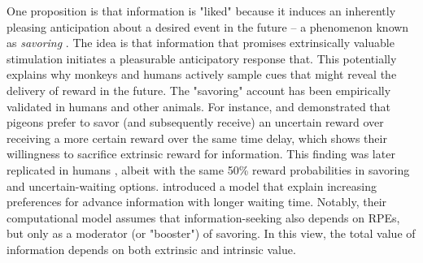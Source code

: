 One proposition is that information is "liked" because it induces an inherently pleasing anticipation about a desired event in the future -- a phenomenon known as \emph{savoring} \parencite{loewenstein_anticipation_1987}. The idea is that information that promises extrinsically valuable stimulation initiates a pleasurable anticipatory response that. This potentially explains why monkeys \parencite{bromberg-martin_midbrain_2009,bromberg-martin_lateral_2011} and humans \parencite{van_lieshout_induction_2018,kobayashi_diverse_2019} actively sample cues that might reveal the delivery of reward in the future. The "savoring" account has been empirically validated in humans and other animals. For instance, \citeauthor{spetch_suboptimal_1990} \citeyearpar{spetch_suboptimal_1990} and \citeauthor{gipson_preference_2009} \citeyearpar{gipson_preference_2009} demonstrated that pigeons prefer to savor (and subsequently receive) an uncertain reward over receiving a more certain \parencite[up to 100\% certain in][]{spetch_suboptimal_1990} reward over the same time delay, which shows their willingness to sacrifice extrinsic reward for information. This finding was later replicated in humans \parencite{iigaya_modulation_2016}, albeit with the same 50\% reward probabilities in savoring and uncertain-waiting options. \citeauthor{iigaya_modulation_2016} \citeyearpar{iigaya_modulation_2016} introduced a model that explain increasing preferences for advance information with longer waiting time. Notably, their computational model assumes that information-seeking also depends on \acp{RPE}, but only as a moderator (or "booster") of savoring. In this view, the total value of information depends on both extrinsic and intrinsic value.

